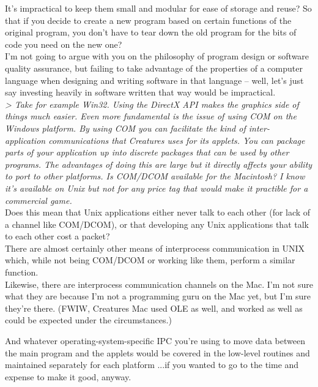 \documentclass[11pt,twoside,a4paper]{article}
\begin{document}
\begin{multicols*}{2}
It's impractical to keep them small and modular for ease of storage and reuse? So that if you decide to create a new program based on certain functions of the original program, you don't have to tear down the old program for the bits of code you need on the new one?~\\

I'm not going to argue with you on the philosophy of program design or software quality assurance, but failing to take advantage of the properties of a computer language when designing and writing software in that language -- well, let's just say investing heavily in software written that way would be impractical.~\\

\emph{> Take for example Win32. Using the DirectX API makes the graphics side of things much easier. Even more fundamental is the issue of using COM on the Windows platform. By using COM you can facilitate the kind of inter- application communications that Creatures uses for its applets. You can package parts of your application up into discrete packages that can be used by other programs. The advantages of doing this are large but it directly affects your ability to port to other platforms. Is COM/DCOM available for the Macintosh? I know it's available on Unix but not for any price tag that would make it practible for a commercial game.}~\\

Does this mean that Unix applications either never talk to each other (for lack of a channel like COM/DCOM), or that developing any Unix applications that talk to each other cost a packet?~\\

There are almost certainly other means of interprocess communication in UNIX which, while not being COM/DCOM or working like them, perform a similar function.~\\

Likewise, there are interprocess communication channels on the Mac. I'm not sure what they are because I'm not a programming guru on the Mac yet, but I'm sure they're there. (FWIW, Creatures Mac used OLE as well, and worked as well as could be expected under the circumstances.)

And whatever operating-system-specific IPC you're using to move data between the main program and the applets would be covered in the low-level routines and maintained separately for each platform ...if you wanted to go to the time and expense to make it good, anyway.


\end{multicols*}
\end{document}
